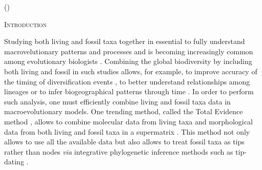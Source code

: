 \documentclass[12pt,letterpaper]{article}
\renewcommand{\section}[1]{%
\bigskip
\begin{center}
\begin{Large}
\normalfont\scshape #1
\medskip
\end{Large}
\end{center}}
\begin{document}
\noindent ()\\

\vspace{1.5in}

\newpage 

%
%

\section{Introduction}
Studying both living and fossil taxa together in essential to fully understand macrovelutionary patterns and processes and is becoming increasingly common among evolutionary biologists \citep{jacksonwhat2006,quentaldiversity2010,dietlconservation2011,slaterunifying2013,fritzdiversity2013,Wood01032013}. Combining the global biodiversity by including both living and fossil in such studies allows, for example, to improve accuracy of the timing of diversification events \citep[e.g.][]{ronquista2012}, to better understand relationships among lineages \citep[e.g.][]{beckancient2014} or to infer biogeographical patterns through time \citep[e.g.][]{Meseguer01032015}. %
In order to perform such analysis, one must efficiently combine living and fossil taxa data in macroevolutionary models. One trending method, called the Total Evidence method \citep{eernissetaxonomic1993,ronquista2012}, allows to combine molecular data from living taxa and morphological data from both living and fossil taxa in a supermatrix \citep[e.g.][]{pyrondivergence2011,ronquista2012,schragocombining2013,slaterunifying2013,beckancient2014,Meseguer01032015}. This method not only allows to use all the available data but also allows to treat fossil taxa as tips rather than nodes \textit{via} integrative phylogenetic inference methods such as tip-dating \citep{ronquista2012,Drummond01082012,Wood01032013,BEASTmaster}.
\end{document}
